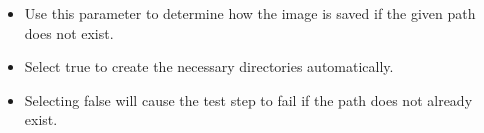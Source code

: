 
\begin{itemize}
\item Use this parameter to determine how the image is saved if the given path does not exist.
\item Select true to create the necessary directories automatically.
\item Selecting false will cause the test step to fail if the path does not already exist.
\end{itemize}
